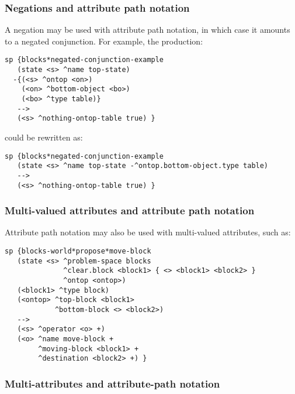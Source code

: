 \subsubsection*{Negations and attribute path notation}


A negation may be used with attribute path notation, in which case it amounts
to a negated conjunction. For example, the production:

\begin{verbatim}
sp {blocks*negated-conjunction-example
   (state <s> ^name top-state)
  -{(<s> ^ontop <on>)
    (<on> ^bottom-object <bo>)
    (<bo> ^type table)}
   -->
   (<s> ^nothing-ontop-table true) } 
\end{verbatim}

could be rewritten as:

\begin{verbatim}
sp {blocks*negated-conjunction-example
   (state <s> ^name top-state -^ontop.bottom-object.type table)
   -->
   (<s> ^nothing-ontop-table true) }
\end{verbatim}


\subsubsection*{Multi-valued attributes and attribute path notation}


Attribute path notation may also be used with multi-valued attributes, such as:

\begin{verbatim}
sp {blocks-world*propose*move-block
   (state <s> ^problem-space blocks
              ^clear.block <block1> { <> <block1> <block2> }
              ^ontop <ontop>)
   (<block1> ^type block)
   (<ontop> ^top-block <block1>
            ^bottom-block <> <block2>)
   -->
   (<s> ^operator <o> +)
   (<o> ^name move-block +
        ^moving-block <block1> +
        ^destination <block2> +) }
\end{verbatim}


\subsubsection*{Multi-attributes and attribute-path notation}
\label{SYNTAX-pm-caveat}

